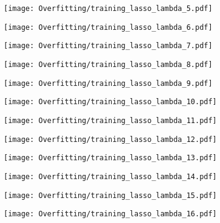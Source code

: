 \documentclass[xcolor=pdftex,dvipsnames,table]{beamer}
\begin{document}
\frame
{
	\begin{center}
		\texttt{[image: Overfitting/training\_lasso\_lambda\_5.pdf]}
	\end{center}
}

\frame
{
	\begin{center}
		\texttt{[image: Overfitting/training\_lasso\_lambda\_6.pdf]}
	\end{center}
}

\frame
{
	\begin{center}
		\texttt{[image: Overfitting/training\_lasso\_lambda\_7.pdf]}
	\end{center}
}

\frame
{
	\begin{center}
		\texttt{[image: Overfitting/training\_lasso\_lambda\_8.pdf]}
	\end{center}
}

\frame
{
	\begin{center}
		\texttt{[image: Overfitting/training\_lasso\_lambda\_9.pdf]}
	\end{center}
}

\frame
{
	\begin{center}
		\texttt{[image: Overfitting/training\_lasso\_lambda\_10.pdf]}
	\end{center}
}

\frame
{
	\begin{center}
		\texttt{[image: Overfitting/training\_lasso\_lambda\_11.pdf]}
	\end{center}
}

\frame
{
	\begin{center}
		\texttt{[image: Overfitting/training\_lasso\_lambda\_12.pdf]}
	\end{center}
}

\frame
{
	\begin{center}
		\texttt{[image: Overfitting/training\_lasso\_lambda\_13.pdf]}
	\end{center}
}

\frame
{
	\begin{center}
		\texttt{[image: Overfitting/training\_lasso\_lambda\_14.pdf]}
	\end{center}
}

\frame
{
	\begin{center}
		\texttt{[image: Overfitting/training\_lasso\_lambda\_15.pdf]}
	\end{center}
}

\frame
{
	\begin{center}
		\texttt{[image: Overfitting/training\_lasso\_lambda\_16.pdf]}
	\end{center}
}
\end{document}
